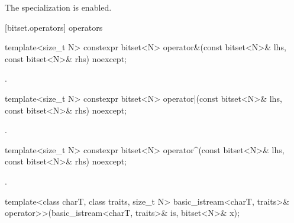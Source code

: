 \begin{itemdescr}
\pnum
The specialization is enabled.
\end{itemdescr}


[bitset.operators]{ operators}

%
\begin{itemdecl}
template<size_t N>
  constexpr bitset<N> operator&(const bitset<N>& lhs, const bitset<N>& rhs) noexcept;
\end{itemdecl}

\begin{itemdescr}
\pnum
\returns
{}.
\end{itemdescr}

%
\begin{itemdecl}
template<size_t N>
  constexpr bitset<N> operator|(const bitset<N>& lhs, const bitset<N>& rhs) noexcept;
\end{itemdecl}

\begin{itemdescr}
\pnum
\returns
{}.
\end{itemdescr}

%
\begin{itemdecl}
template<size_t N>
  constexpr bitset<N> operator^(const bitset<N>& lhs, const bitset<N>& rhs) noexcept;
\end{itemdecl}

\begin{itemdescr}
\pnum
\returns
{}.
\end{itemdescr}

%
\begin{itemdecl}
template<class charT, class traits, size_t N>
  basic_istream<charT, traits>&
    operator>>(basic_istream<charT, traits>& is, bitset<N>& x);
\end{itemdecl}

